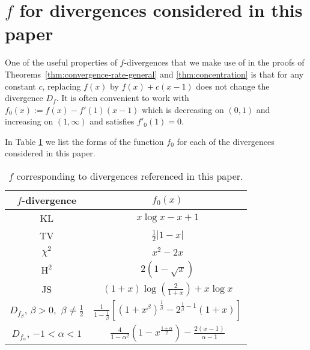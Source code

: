 \section{$f$ for divergences considered in this paper}\label{appendix:f-fns}

One of the useful properties of $f$-divergences that we make use of in the proofs of Theorems~\ref{thm:convergence-rate-general} and \ref{thm:concentration} is that for any constant $c$, replacing $f(x)$ by $f(x) + c(x-1)$ does not change the divergence $D_f$. 
It is often convenient to work with $f_0(x) := f(x) - f'(1)(x-1)$ which is decreasing on $(0, 1)$ and increasing on $(1, \infty)$ and satisfies $f'_0(1)=0$.

In Table \ref{table:f-fns} we list the forms of the function $f_0$ for each of the divergences considered in this paper.


{
\renewcommand{\arraystretch}{2}
\begin{table}
 \caption{$f$ corresponding to divergences referenced in this paper.}
 \label{table:f-fns}
 \centering
 \begin{tabular}{c c} 
 \toprule
 $f$-divergence & $f_0(x)$ \\
 \midrule
 KL & $x \log x - x + 1$\\
 TV & $\frac{1}{2}|1-x|$\\
 $\chi^2$ & $x^2 - 2x$\\
 $\text{H}^2$ & $2(1-\sqrt{x})$\\
 JS & $(1+x)\log(\frac{2}{1+x}) + x\log x$\\
 $D_{f_\beta}$, $\beta > 0,$ $\beta\not=\frac{1}{2}$ & $\frac{1}{1-\frac{1}{\beta}}\left[ (1+x^\beta)^{\frac{1}{\beta}} - 2^{\frac{1}{\beta}-1}(1+x) \right]$\\
 $D_{f_\alpha}$, $-1<\alpha < 1$ & $\frac{4}{1-\alpha^2}\left( 1 - x^{\frac{1+\alpha}{2}} \right) - \frac{2(x-1)}{\alpha-1}$ \\
 \bottomrule
\end{tabular}
\end{table}
}